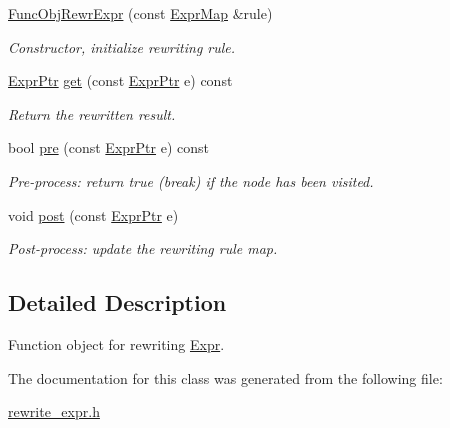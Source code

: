 \begin{DoxyCompactItemize}
\item 
\mbox{\label{classilang_1_1_func_obj_rewr_expr_afff85c3a0980d75a3fefb39d416cd918}} 
\mbox{\hyperlink{classilang_1_1_func_obj_rewr_expr_afff85c3a0980d75a3fefb39d416cd918}{Func\+Obj\+Rewr\+Expr}} (const \mbox{\hyperlink{namespaceilang_ad40e6475e04844bcad9c380aac0b215c}{Expr\+Map}} \&rule)
\begin{DoxyCompactList}\small\item\em Constructor, initialize rewriting rule. \end{DoxyCompactList}\item 
\mbox{\label{classilang_1_1_func_obj_rewr_expr_aaf6944bfc75966e0fa020b1310fa5ca5}} 
\mbox{\hyperlink{namespaceilang_a7c4196c72e53ea4df4b7861af7bc3bce}{Expr\+Ptr}} \mbox{\hyperlink{classilang_1_1_func_obj_rewr_expr_aaf6944bfc75966e0fa020b1310fa5ca5}{get}} (const \mbox{\hyperlink{namespaceilang_a7c4196c72e53ea4df4b7861af7bc3bce}{Expr\+Ptr}} e) const
\begin{DoxyCompactList}\small\item\em Return the rewritten result. \end{DoxyCompactList}\item 
\mbox{\label{classilang_1_1_func_obj_rewr_expr_acf58f353d67f6976002d436719ebd24a}} 
bool \mbox{\hyperlink{classilang_1_1_func_obj_rewr_expr_acf58f353d67f6976002d436719ebd24a}{pre}} (const \mbox{\hyperlink{namespaceilang_a7c4196c72e53ea4df4b7861af7bc3bce}{Expr\+Ptr}} e) const
\begin{DoxyCompactList}\small\item\em Pre-\/process\+: return true (break) if the node has been visited. \end{DoxyCompactList}\item 
\mbox{\label{classilang_1_1_func_obj_rewr_expr_ab8e5326a0a7a025b8620e063828f6bf2}} 
void \mbox{\hyperlink{classilang_1_1_func_obj_rewr_expr_ab8e5326a0a7a025b8620e063828f6bf2}{post}} (const \mbox{\hyperlink{namespaceilang_a7c4196c72e53ea4df4b7861af7bc3bce}{Expr\+Ptr}} e)
\begin{DoxyCompactList}\small\item\em Post-\/process\+: update the rewriting rule map. \end{DoxyCompactList}\end{DoxyCompactItemize}


\subsection{Detailed Description}
Function object for rewriting \mbox{\hyperlink{classilang_1_1_expr}{Expr}}. 

The documentation for this class was generated from the following file\+:\begin{DoxyCompactItemize}
\item 
\mbox{\hyperlink{rewrite__expr_8h}{rewrite\+\_\+expr.\+h}}\end{DoxyCompactItemize}
